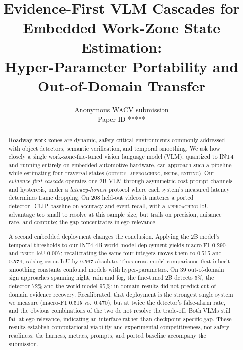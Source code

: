 \documentclass[10pt,twocolumn,letterpaper]{article}
\def\wacvPaperID{*****} %
\begin{document}
\title{Evidence-First VLM Cascades for Embedded Work-Zone State Estimation:\\Hyper-Parameter Portability and Out-of-Domain Transfer}

\author{Anonymous WACV submission\\
Paper ID \wacvPaperID}
\maketitle

\begin{abstract}
Roadway work zones are dynamic, safety-critical environments commonly addressed with object detectors, semantic verification, and temporal smoothing.  We ask how closely a single work-zone-fine-tuned vision--language model (VLM), quantized to INT4 and running entirely on embedded automotive hardware, can approach such a pipeline while estimating four traversal states (\textsc{outside}, \textsc{approaching}, \textsc{inside}, \textsc{exiting}).  Our \emph{evidence-first cascade} operates one 2B VLM through asymmetric-cost prompt channels and hysteresis, under a \emph{latency-honest} protocol where each system's measured latency determines frame dropping.  On 208 held-out videos it matches a ported detector+CLIP baseline on accuracy and event recall, with a \textsc{approaching}-IoU advantage too small to resolve at this sample size, but trails on precision, nuisance rate, and compute; the gap concentrates in ego-relevance.

A second embedded deployment changes the conclusion.  Applying the 2B model's temporal thresholds to our INT4 4B world-model deployment yields macro-F1 0.290 and \textsc{inside} IoU 0.007; recalibrating the same four integers moves them to 0.515 and 0.574, raising \textsc{inside} IoU by 0.567 absolute.  Thus cross-model comparisons that inherit smoothing constants confound models with hyper-parameters.  On 39 out-of-domain sign approaches spanning night, rain and fog, the fine-tuned 2B detects 5\%, the detector 72\% and the world model 95\%: in-domain results did not predict out-of-domain evidence recovery.  Recalibrated, that deployment is the strongest single system we measure (macro-F1 0.515 vs.\ 0.470), but at twice the detector's false-alarm rate, and the obvious combinations of the two do not resolve the trade-off.  Both VLMs still fail at ego-relevance, indicating an interface rather than checkpoint-specific gap.  These results establish computational viability and experimental competitiveness, not safety readiness; the harness, metrics, prompts, and ported baseline accompany the submission.
\end{abstract}
\end{document}
